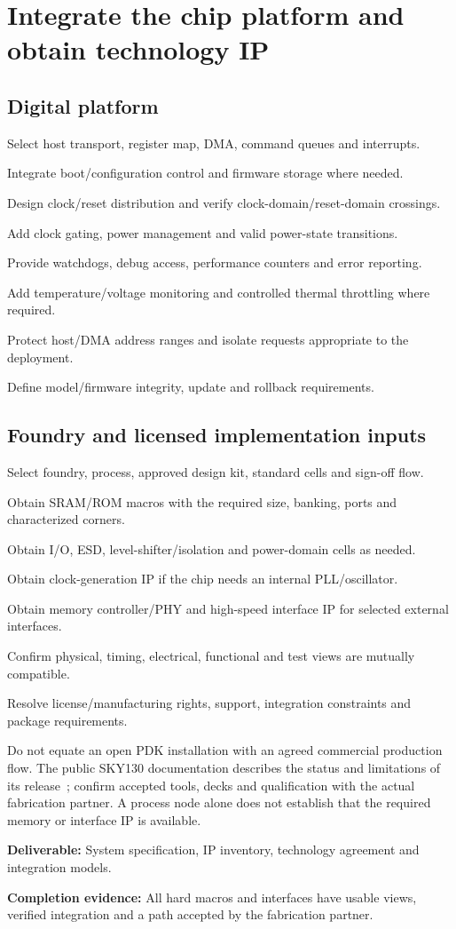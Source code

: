 \documentclass[11pt,a4paper]{article}
\newcommand{\phase}[2]{\clearpage\section{#1}\label{#2}}
\newcommand{\deliver}[2]{\begin{tcolorbox}[colback=pale,colframe=line,boxrule=0.5pt,arc=1mm,left=8pt,right=8pt,top=6pt,bottom=6pt]\textbf{Deliverable:} #1\par\textbf{Completion evidence:} #2\end{tcolorbox}}
\begin{document}
\phase{Integrate the chip platform and obtain technology IP}{sec:soc}
\subsection*{Digital platform}
\begin{checklist}
\item Select host transport, register map, DMA, command queues and interrupts.
\item Integrate boot/configuration control and firmware storage where needed.
\item Design clock/reset distribution and verify clock-domain/reset-domain crossings.
\item Add clock gating, power management and valid power-state transitions.
\item Provide watchdogs, debug access, performance counters and error reporting.
\item Add temperature/voltage monitoring and controlled thermal throttling where required.
\item Protect host/DMA address ranges and isolate requests appropriate to the deployment.
\item Define model/firmware integrity, update and rollback requirements.
\end{checklist}
\subsection*{Foundry and licensed implementation inputs}
\begin{checklist}
\item Select foundry, process, approved design kit, standard cells and sign-off flow.
\item Obtain SRAM/ROM macros with the required size, banking, ports and characterized corners.
\item Obtain I/O, ESD, level-shifter/isolation and power-domain cells as needed.
\item Obtain clock-generation IP if the chip needs an internal PLL/oscillator.
\item Obtain memory controller/PHY and high-speed interface IP for selected external interfaces.
\item Confirm physical, timing, electrical, functional and test views are mutually compatible.
\item Resolve license/manufacturing rights, support, integration constraints and package requirements.
\end{checklist}
Do not equate an open PDK installation with an agreed commercial production
flow. The public SKY130 documentation describes the status and limitations of
its release~\cite{sky130}; confirm accepted tools, decks and qualification with
the actual fabrication partner. A process node alone does not establish that
the required memory or interface IP is available.
\deliver{System specification, IP inventory, technology agreement and integration
models.}{All hard macros and interfaces have usable views, verified integration
and a path accepted by the fabrication partner.}
\end{document}
